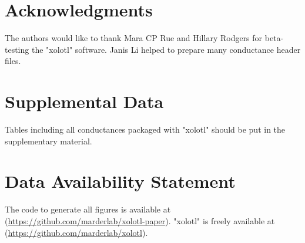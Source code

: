 \documentclass{frontiersSCNS} %
\begin{document}
\section*{Acknowledgments}
The authors would like to thank Mara CP Rue and Hillary Rodgers for beta-testing the "xolotl" software. Janis Li helped to prepare many conductance header files.

\section*{Supplemental Data}
Tables including all conductances packaged with "xolotl" should be put in the supplementary material.

\section*{Data Availability Statement}

The code to generate all figures is available at (\url{https://github.com/marderlab/xolotl-paper}). "xolotl" is freely available at (\url{https://github.com/marderlab/xolotl}).

%
%
%
%
%
%

\printbibliography

%
%
%
%
%
%



\FloatBarrier
\end{document}
